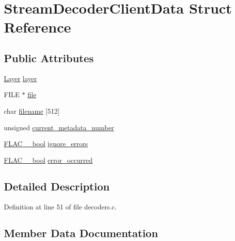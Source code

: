\hypertarget{struct_stream_decoder_client_data}{}\section{Stream\+Decoder\+Client\+Data Struct Reference}
\label{struct_stream_decoder_client_data}
\subsection*{Public Attributes}
\begin{DoxyCompactItemize}
\item 
\hyperlink{decoders_8c_a9a8118be7780e95363d631cbca7e7800}{Layer} \hyperlink{struct_stream_decoder_client_data_af6c5ac1bde00cccdc5a178310c47de89}{layer}
\item 
F\+I\+LE $\ast$ \hyperlink{struct_stream_decoder_client_data_a840124d1e6584161d0c9825e2aa19d29}{file}
\item 
char \hyperlink{struct_stream_decoder_client_data_a3d8a4027448583d4cf337c46a9b46680}{filename} \mbox{[}512\mbox{]}
\item 
unsigned \hyperlink{struct_stream_decoder_client_data_adfcec694a112d64c6bee5237c4f5fb7b}{current\+\_\+metadata\+\_\+number}
\item 
\hyperlink{ordinals_8h_a95103469f1cbd78b8cf250194985b34e}{F\+L\+A\+C\+\_\+\+\_\+bool} \hyperlink{struct_stream_decoder_client_data_a6d4f7d982690583973f5300f7053d419}{ignore\+\_\+errors}
\item 
\hyperlink{ordinals_8h_a95103469f1cbd78b8cf250194985b34e}{F\+L\+A\+C\+\_\+\+\_\+bool} \hyperlink{struct_stream_decoder_client_data_aec3d90fca3d1235cb53f3f2b70fb4dd5}{error\+\_\+occurred}
\end{DoxyCompactItemize}


\subsection{Detailed Description}


Definition at line 51 of file decoders.\+c.



\subsection{Member Data Documentation}
